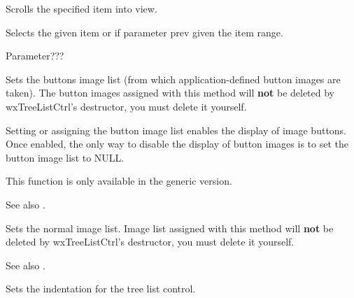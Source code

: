 Scrolls the specified item into view.

\label{wxtreelistctrlselectitem}


Selects the given item or if parameter prev given the item range.

Parameter???

\label{wxtreelistctrlsetbuttonsimagelist}


Sets the buttons image list (from which application-defined button images are taken).
The button images assigned with this method will
{\bf not} be deleted by wxTreeListCtrl's destructor, you must delete it yourself.

Setting or assigning the button image list enables the display of image buttons.
Once enabled, the only way to disable the display of button images is to set
the button image list to NULL.

This function is only available in the generic version.

See also .

\label{wxtreelistctrlsetimagelist}


Sets the normal image list. Image list assigned with this method will
{\bf not} be deleted by wxTreeListCtrl's destructor, you must delete it yourself.

See also .

\label{wxtreelistctrlsetindent}


Sets the indentation for the tree list control.

\label{wxtreelistctrlsetitembackgroundcolour}


